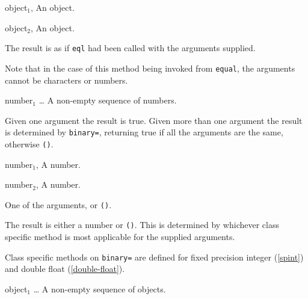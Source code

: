 \begin{optDefinition}

\begin{specargs}
\item[object$_1$, \objectclass] An object.
\item[object$_2$, \objectclass] An object.
\end{specargs}

\result%
The result is as if {\tt eql} had been called with the arguments
supplied.

\remarks%
Note that in the case of this method being invoked from {\tt equal},
the arguments cannot be characters or numbers.

\function{=}

\begin{arguments}
\item[{number$_1$ \ldots}] A non-empty sequence of numbers.
\end{arguments}

\result%
Given one argument the result is true.  Given more than one argument
the result is determined by {\tt binary=}, returning true if all the
arguments are the same, otherwise {\tt ()}.


\begin{genericargs}
\item[number$_1$, \numberclass] A number.
\item[number$_2$, \numberclass] A number.
\end{genericargs}

\result%
One of the arguments, or {\tt ()}.

\remarks%
The result is either a number or {\tt ()}.  This is determined by
whichever class specific method is most applicable for the supplied
arguments.

\seealso%
Class specific methods on {\tt binary=} are defined for fixed
precision integer (\ref{spint}) and double float (\ref{double-float}).

%
%

\function{<}

\begin{arguments}
\item[object$_1$ \ldots] A non-empty sequence of objects.
\end{arguments}


\end{optDefinition}
